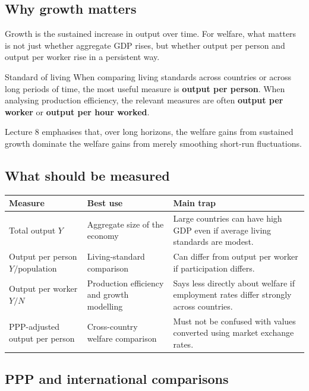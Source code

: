 \documentclass[12pt]{article}
\begin{document}
\subsection{Why growth matters}

Growth is the sustained increase in output over time. For welfare, what matters is not just whether aggregate GDP rises, but whether output per person and output per worker rise in a persistent way.

\begin{definition}{Standard of living}{}
When comparing living standards across countries or across long periods of time, the most useful measure is \textbf{output per person}. When analysing production efficiency, the relevant measures are often \textbf{output per worker} or \textbf{output per hour worked}.
\end{definition}

Lecture 8 emphasises that, over long horizons, the welfare gains from sustained growth dominate the welfare gains from merely smoothing short-run fluctuations.

\subsection{What should be measured}

\begin{center}
\renewcommand{\arraystretch}{1.2}
\begin{tabularx}{\textwidth}{|p{3.0cm}|X|X|}
\hline
\textbf{Measure} & \textbf{Best use} & \textbf{Main trap} \\
\hline
Total output \(Y\) & Aggregate size of the economy & Large countries can have high GDP even if average living standards are modest. \\
\hline
Output per person \(Y/\text{population}\) & Living-standard comparison & Can differ from output per worker if participation differs. \\
\hline
Output per worker \(Y/N\) & Production efficiency and growth modelling & Says less directly about welfare if employment rates differ strongly across countries. \\
\hline
PPP-adjusted output per person & Cross-country welfare comparison & Must not be confused with values converted using market exchange rates. \\
\hline
\end{tabularx}
\end{center}

\subsection{PPP and international comparisons}
\end{document}
